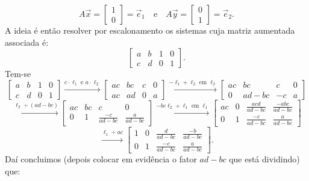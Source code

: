 \documentclass[../livro.tex]{subfiles}  %
\begin{document}
\begin{equation}
A \vec{x} =
\left[
\begin{array}{c}
1  \\
0 
\end{array}
\right] = \vec{e}_1 \quad \text{e} \quad
A \vec{y} =
\left[
\begin{array}{c}
0  \\
1 
\end{array}
\right] = \vec{e}_2.
\end{equation} A ideia é então resolver por escalonamento os sistemas cuja matriz aumentada associada é:
\begin{equation}
\left[
\begin{array}{cc|cc}
a & b & 1 & 0 \\
c & d & 0 & 1 
\end{array}
\right].
\end{equation} Tem-se
\begin{equation}
\left[
\begin{array}{cc|cc}
a & b & 1 & 0 \\
c & d & 0 & 1 
\end{array}
\right] \xrightarrow{c\cdot \ell_1 \text{ e } a\cdot \ell_2}
\left[
\begin{array}{cc|cc}
ac & bc & c & 0 \\
ac & ad & 0 & a 
\end{array}
\right] \xrightarrow{-\ell_1 + \ell_2 \text{ em } \ell_2}
\left[
\begin{array}{cc|cc}
ac & bc      & c  & 0 \\
0 & ad - bc & -c & a 
\end{array}
\right]
\end{equation}
\begin{equation}
\xrightarrow{\ell_2 \div (ad-bc)}
\left[
\begin{array}{cc|cc}
ac & bc      & c  & 0 \\
0 & 1 & \frac{-c}{ad - bc} & \frac{a}{ad - bc} 
\end{array}
\right]  \xrightarrow{-bc\ell_2 + \ell_1 \text{ em } \ell_1}
\left[
\begin{array}{cc|cc}
ac & 0 & \frac{acd}{ad - bc} & \frac{-abc}{ad - bc} \\
0 & 1 & \frac{-c}{ad - bc}  & \frac{a}{ad - bc} 
\end{array}
\right]
\end{equation}
\begin{equation}
\xrightarrow{\ell_1 \div ac}
\left[
\begin{array}{cc|cc}
1 & 0 & \frac{ d}{ad - bc}  & \frac{-b}{ad - bc} \\
0 & 1 & \frac{-c}{ad - bc}  & \frac{ a}{ad - bc} 
\end{array}
\right].
\end{equation} Daí concluimos (depois colocar em evidência o fator $ad - bc$ que está dividindo) que:
\end{document}
